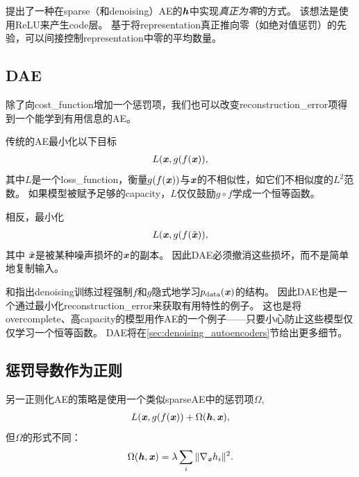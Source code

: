 \citet{Glorot+al-ICML-2011-small}提出了一种在\gls{sparse}（和\gls{denoising}）\gls{AE}的$\boldsymbol{\mathit{h}}$中实现\emph{真正为零}的方式。
该想法是使用\gls{ReLU}来产生\gls{code}层。
基于将\gls{representation}真正推向零（如绝对值惩罚）的先验，可以间接控制\gls{representation}中零的平均数量。



\subsection{\gls{DAE}}
\label{sec:sub_denoising_autoencoders}
除了向\gls{cost_function}增加一个惩罚项，我们也可以改变\gls{reconstruction_error}项得到一个能学到有用信息的\gls{AE}。


传统的\gls{AE}最小化以下目标
\begin{align}
L(\boldsymbol{\mathit{x}}, g(f(\boldsymbol{\mathit{x}})),
\end{align}
其中$L$是一个\gls{loss_function}，衡量$g(f(\boldsymbol{\mathit{x}}))$与$\boldsymbol{\mathit{x}}$的不相似性，如它们不相似度的$L^2$范数。
如果模型被赋予足够的\gls{capacity}，$L$仅仅鼓励$g \circ  f$学成一个恒等函数。


相反，最小化 
\begin{align}
L(\boldsymbol{\mathit{x}}, g(f(\tilde {\boldsymbol{\mathit{x}}})),
\end{align}
其中 $\tilde {\boldsymbol{\mathit{x}}}$是被某种噪声损坏的$\boldsymbol{\mathit{x}}$的副本。
因此\gls{DAE}必须撤消这些损坏，而不是简单地复制输入。

\citet{Alain+Bengio-ICLR2013-small}和\citet{Bengio-et-al-NIPS2013-small}指出\gls{denoising}训练过程强制$f$和$g$隐式地学习$p_{\text{data}} (\boldsymbol{\mathit{x}})$的结构。
因此\gls{DAE}也是一个通过最小化\gls{reconstruction_error}来获取有用特性的例子。
这也是将\gls{overcomplete}、高\gls{capacity}的模型用作\gls{AE}的一个例子——只要小心防止这些模型仅仅学习一个恒等函数。
\gls{DAE}将在\ref{sec:denoising_autoencoders}节给出更多细节。


\subsection{惩罚导数作为正则}
\label{sec:regularizing_by_penalizing_derivatives}
另一正则化\gls{AE}的策略是使用一个类似\gls{sparse}\gls{AE}中的惩罚项$\Omega$,
\begin{align}
L(\boldsymbol{\mathit{x}}, g(f(\boldsymbol{\mathit{x}})) + \Omega(\boldsymbol{\mathit{h}}, \boldsymbol{\mathit{x}}),
\end{align}
但$\Omega$的形式不同：
\begin{align}
\Omega(\boldsymbol{\mathit{h}}, \boldsymbol{\mathit{x}}) = \lambda \sum_i \| \nabla_{\boldsymbol{\mathit{x}}}h_i \|^2.
\end{align}


